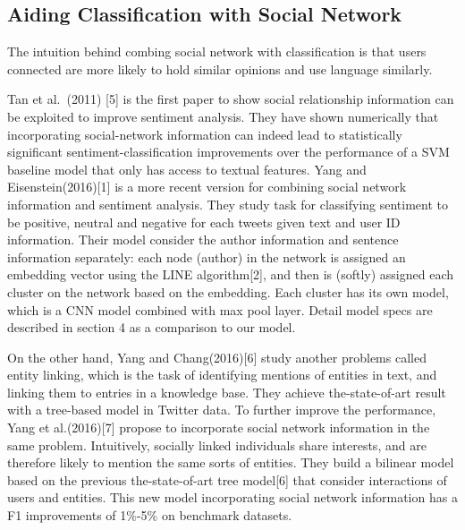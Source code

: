 \subsection*{Aiding Classification with Social Network}

The intuition behind combing social network with classification is that users connected are more likely to hold similar opinions and use language similarly. 

Tan et al.\ (2011) [5] is the first paper to show social relationship information can be exploited to improve sentiment analysis. They have shown numerically that incorporating social-network information can indeed lead to statistically significant sentiment-classification improvements over the performance of a SVM baseline model that only has access to textual features. Yang and Eisenstein(2016)[1] is a more recent version for combining social network information and sentiment analysis. They study task for classifying sentiment to be positive, neutral and negative for each tweets given text and user ID information. Their model consider the author information and sentence information separately: each node (author) in the network is assigned an embedding vector using the LINE algorithm[2], and then is (softly) assigned each cluster on the network based on the embedding. Each cluster has its own model, which is a CNN model combined with max pool layer. Detail model specs are described in section 4 as a comparison to our model.

On the other hand, Yang and Chang(2016)[6] study another problems called entity linking, which is the task of identifying mentions
of entities in text, and linking them to entries in a knowledge base. They achieve the-state-of-art result with a tree-based model in Twitter data.  To further improve the performance, Yang et al.(2016)[7] propose to incorporate social network information in the same problem. Intuitively, socially linked individuals share interests, and are therefore likely to mention the same sorts of entities. They build a bilinear model based on the previous the-state-of-art tree model[6] that consider interactions of users and entities. This new model incorporating social network information has a F1 improvements of 1\%-5\% on benchmark datasets.